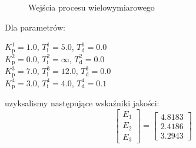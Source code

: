 \begin{figure}
    \begin{subfigure}[b]{\textwidth}
        \centering
    \end{subfigure}
    \caption{Wejścia procesu wielowymiarowego}
    \label{pro_pid_2_in}
\end{figure}
\FloatBarrier



Dla parametrów: \\
\begin{center}
    $K^{\num{1}}_{\mathrm{p}} = \num{1.0}$, $T^{\num{1}}_{\mathrm{i}} = \num{5.0}$, $T^{\num{1}}_{\mathrm{d}} = \num{0.0}$ \\
    $K^{\num{2}}_{\mathrm{p}} = \num{0.0}$, $T^{\num{2}}_{\mathrm{i}} = \infty$, $T^{\num{2}}_{\mathrm{d}} = \num{0.0}$ \\
    $K^{\num{3}}_{\mathrm{p}} = \num{7.0}$, $T^{\num{3}}_{\mathrm{i}} = \num{12.0}$, $T^{\num{3}}_{\mathrm{d}} = \num{0.0}$ \\
    $K^{\num{4}}_{\mathrm{p}} = \num{3.0}$, $T^{\num{4}}_{\mathrm{i}} = \num{4.0}$, $T^{\num{4}}_{\mathrm{d}} = \num{0.1}$ \\
\end{center}

uzyksalismy następujące wskaźniki jakości:\\

\[
\begin{bmatrix}
    E_{\mathrm{1}} \\
    E_{\mathrm{2}} \\
    E_{\mathrm{3}} 
\end{bmatrix}
= 
\begin{bmatrix}
    \num{4.8183} \\
    \num{2.4186} \\
    \num{3.2943}
\end{bmatrix}
\]

